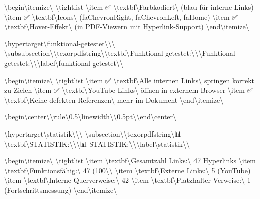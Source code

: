 \textbackslash{}begin\textbackslash{}{itemize\textbackslash{}}
\textbackslash{}tightlist
\textbackslash{}item
  ✅ \textbackslash{}textbf\textbackslash{}{Farbkodiert\textbackslash{}} (blau für interne Links)
\textbackslash{}item
  ✅ \textbackslash{}textbf\textbackslash{}{Icons\textbackslash{}} (faChevronRight, faChevronLeft, faHome)
\textbackslash{}item
  ✅ \textbackslash{}textbf\textbackslash{}{Hover-Effekt\textbackslash{}} (in PDF-Viewern mit Hyperlink-Support)
\textbackslash{}end\textbackslash{}{itemize\textbackslash{}}

\textbackslash{}hypertarget\textbackslash{}{funktional-getestet\textbackslash{}}\textbackslash{}{\textbackslash{}%
\textbackslash{}subsubsection\textbackslash{}{\textbackslash{}texorpdfstring\textbackslash{}{\textbackslash{}textbf\textbackslash{}{Funktional getestet:\textbackslash{}}\textbackslash{}}\textbackslash{}{Funktional getestet:\textbackslash{}}\textbackslash{}}\textbackslash{}label\textbackslash{}{funktional-getestet\textbackslash{}}\textbackslash{}}

\textbackslash{}begin\textbackslash{}{itemize\textbackslash{}}
\textbackslash{}tightlist
\textbackslash{}item
  ✅ \textbackslash{}textbf\textbackslash{}{Alle internen Links\textbackslash{}} springen korrekt zu Zielen
\textbackslash{}item
  ✅ \textbackslash{}textbf\textbackslash{}{YouTube-Links\textbackslash{}} öffnen in externem Browser
\textbackslash{}item
  ✅ \textbackslash{}textbf\textbackslash{}{Keine defekten Referenzen\textbackslash{}} mehr im Dokument
\textbackslash{}end\textbackslash{}{itemize\textbackslash{}}

\textbackslash{}begin\textbackslash{}{center\textbackslash{}}\textbackslash{}rule\textbackslash{}{0.5\textbackslash{}linewidth\textbackslash{}}\textbackslash{}{0.5pt\textbackslash{}}\textbackslash{}end\textbackslash{}{center\textbackslash{}}

\textbackslash{}hypertarget\textbackslash{}{statistik\textbackslash{}}\textbackslash{}{\textbackslash{}%
\textbackslash{}subsection\textbackslash{}{\textbackslash{}texorpdfstring\textbackslash{}{📊 \textbackslash{}textbf\textbackslash{}{STATISTIK:\textbackslash{}}\textbackslash{}}\textbackslash{}{📊 STATISTIK:\textbackslash{}}\textbackslash{}}\textbackslash{}label\textbackslash{}{statistik\textbackslash{}}\textbackslash{}}

\textbackslash{}begin\textbackslash{}{itemize\textbackslash{}}
\textbackslash{}tightlist
\textbackslash{}item
  \textbackslash{}textbf\textbackslash{}{Gesamtzahl Links:\textbackslash{}} 47 Hyperlinks
\textbackslash{}item
  \textbackslash{}textbf\textbackslash{}{Funktionsfähig:\textbackslash{}} 47 (100\textbackslash{}\textbackslash{}%
\textbackslash{}item
  \textbackslash{}textbf\textbackslash{}{Externe Links:\textbackslash{}} 5 (YouTube)
\textbackslash{}item
  \textbackslash{}textbf\textbackslash{}{Interne Querverweise:\textbackslash{}} 42
\textbackslash{}item
  \textbackslash{}textbf\textbackslash{}{Platzhalter-Verweise:\textbackslash{}} 1 (Fortschrittsmessung)
\textbackslash{}end\textbackslash{}{itemize\textbackslash{}}

